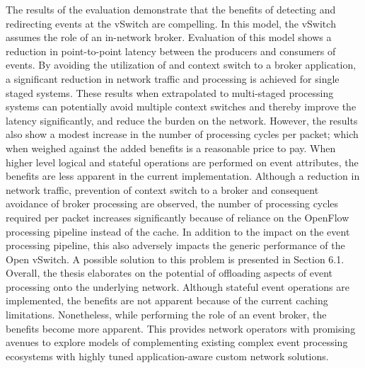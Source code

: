 The results of the evaluation demonstrate that the benefits of detecting and redirecting events at the vSwitch are compelling. In this model, the vSwitch assumes the role of an in-network broker. Evaluation of this model shows a reduction in point-to-point latency between the producers and consumers of events. By avoiding the utilization of and context switch to a broker application, a significant reduction in network traffic and processing is achieved for single staged systems. These results when extrapolated to multi-staged processing systems can potentially avoid multiple context switches and thereby improve the latency significantly, and reduce the burden on the network. However, the results also show a modest increase in the number of processing cycles per packet; which when weighed against the added benefits is a reasonable price to pay. \newline \newline When higher level logical and stateful operations are performed on event attributes, the benefits are less apparent in the current implementation. Although a reduction in network traffic, prevention of context switch to a broker and consequent avoidance of broker processing are observed, the number of processing cycles required per packet increases significantly because of reliance on the OpenFlow processing pipeline instead of the cache. In addition to the impact on the event processing pipeline, this also adversely impacts the generic performance of the Open vSwitch. A possible solution to this problem is presented in Section 6.1. Overall, the thesis elaborates on the potential of offloading aspects of event processing onto the underlying network. Although stateful event operations are implemented, the benefits are not apparent because of the current caching limitations. Nonetheless, while performing the role of an event broker, the benefits become more apparent. This provides network operators with promising avenues to explore models of complementing existing complex event processing ecosystems with highly tuned application-aware custom network solutions.

